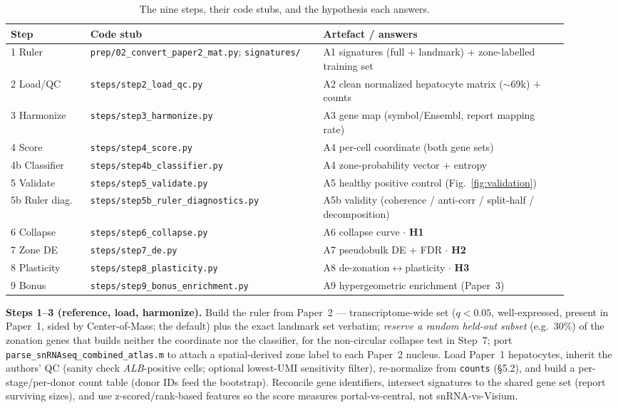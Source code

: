 \documentclass[11pt]{article}
\newcommand{\gene}[1]{\textit{#1}}
\newcommand{\code}[1]{\texttt{#1}}
\begin{document}
\begin{table}[h]
\centering\small
\caption{The nine steps, their code stubs, and the hypothesis each answers.}
\label{tab:steps}
\begin{tabular}{@{}p{0.13\linewidth} p{0.38\linewidth} p{0.40\linewidth}@{}}
\toprule
\textbf{Step} & \textbf{Code stub} & \textbf{Artefact / answers}\\
\midrule
1 Ruler & \code{prep/02\_convert\_paper2\_mat.py}; \code{signatures/} & A1 signatures (full $+$ landmark)
$+$ zone-labelled training set\\
2 Load/QC & \code{steps/step2\_load\_qc.py} & A2 clean normalized hepatocyte matrix ($\sim$69k) $+$
counts\\
3 Harmonize & \code{steps/step3\_harmonize.py} & A3 gene map (symbol/Ensembl, report mapping rate)\\
4 Score & \code{steps/step4\_score.py} & A4 per-cell coordinate (both gene sets)\\
4b Classifier & \code{steps/step4b\_classifier.py} & A4 zone-probability vector $+$ entropy\\
5 Validate & \code{steps/step5\_validate.py} & A5 healthy positive control (Fig.~\ref{fig:validation})\\
5b Ruler diag. & \code{steps/step5b\_ruler\_diagnostics.py} & A5b validity (coherence / anti-corr /
split-half / decomposition)\\
6 Collapse & \code{steps/step6\_collapse.py} & A6 collapse curve $\cdot$ \textbf{H1}\\
7 Zone DE & \code{steps/step7\_de.py} & A7 pseudobulk DE $+$ FDR $\cdot$ \textbf{H2}\\
8 Plasticity & \code{steps/step8\_plasticity.py} & A8 de-zonation$\leftrightarrow$plasticity $\cdot$
\textbf{H3}\\
9 Bonus & \code{steps/step9\_bonus\_enrichment.py} & A9 hypergeometric enrichment (Paper~3)\\
\bottomrule
\end{tabular}
\end{table}

\textbf{Steps 1--3 (reference, load, harmonize).} Build the ruler from Paper~2 --- transcriptome-wide
set ($q<0.05$, well-expressed, present in Paper~1, sided by Center-of-Mass; the default) plus the exact
landmark set verbatim; \emph{reserve a random held-out subset} (e.g.\ 30\%) of the zonation genes that
builds neither the coordinate nor the classifier, for the non-circular collapse test in Step~7; port
\code{parse\_snRNAseq\_combined\_atlas.m} to attach a spatial-derived zone label to each Paper~2 nucleus.
Load Paper~1 hepatocytes, inherit the authors' QC (sanity check \gene{ALB}-positive cells; optional
lowest-UMI sensitivity filter), re-normalize from \code{counts} (\S5.2), and build a per-stage/per-donor
count table (donor IDs feed the bootstrap). Reconcile gene identifiers, intersect signatures to the
shared gene set (report surviving sizes), and use z-scored/rank-based features so the score measures
portal-vs-central, not snRNA-vs-Visium.
\end{document}
